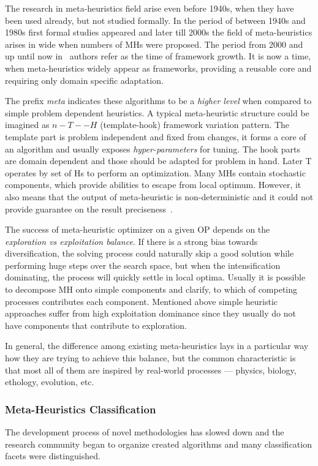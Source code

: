 The research in meta-heuristics field arise even before 1940s, when they have been used already, but not studied formally. In the period of between 1940s and 1980s first formal studies appeared and later till 2000s the field of meta-heuristics arises in wide when numbers of MHs were proposed. The period from 2000 and up until now in~\cite{sorensen2017history} authors refer as the time of framework growth. It is now a time, when meta-heuristics widely appear as frameworks, providing a reusable core and requiring only domain specific adaptation.

The prefix \textit{meta} indicates these algorithms to be a \textit{higher level} when compared to simple problem dependent heuristics. A typical meta-heuristic structure could be imagined as $n-T--H$ (template-hook) framework variation pattern. The template part is problem independent and fixed from changes, it forms a core of an algorithm and usually exposes \textit{hyper-parameters} for tuning. The hook parts are domain dependent and those should be adapted for problem in hand. Later T operates by set of Hs to perform an optimization.
Many MHs contain stochastic components, which provide abilities to escape from local optimum. However, it also means that the output of meta-heuristic is non-deterministic and it could not provide guarantee on the result preciseness~\cite{boussaid2013survey}.

The success of meta-heuristic optimizer on a given OP depends on the \textit{exploration vs exploitation balance}. If there is a strong bias towards diversification, the solving process could naturally skip a good solution while performing huge steps over the search space, but when the intensification dominating, the process will quickly settle in local optima. Usually it is possible to decompose MH onto simple components and clarify, to which of competing processes contributes each component. Mentioned above simple heuristic approaches suffer from high exploitation dominance since they usually do not have components that contribute to exploration.

In general, the difference among existing meta-heuristics lays in a particular way how they are trying to achieve this balance, but the common characteristic is that most all of them are inspired by real-world processes — physics, biology, ethology, evolution, etc.


\subsubsection{Meta-Heuristics Classification}
The development process of novel methodologies has slowed down and the research community began to organize created algorithms and many classification facets were distinguished.

